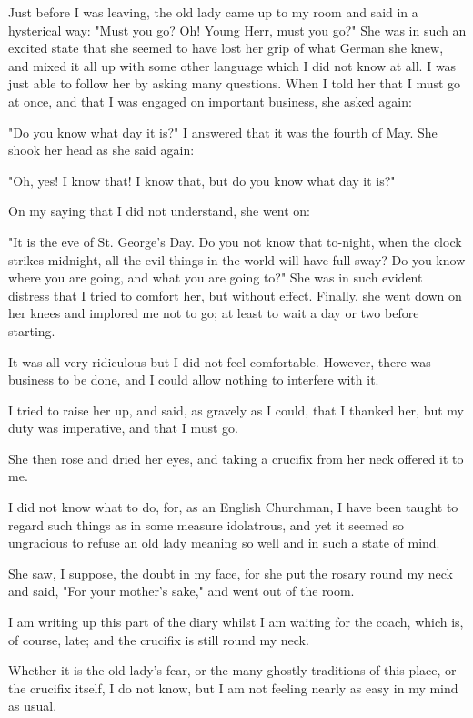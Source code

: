 Just before I was leaving, the old lady came up to my room and said in a hysterical way: "Must you go? Oh! Young Herr, must you go?" She was in such an excited state that she seemed to have lost her grip of what German she knew, and mixed it all up with some other language which I did not know at all. I was just able to follow her by asking many questions. When I told her that I must go at once, and that I was engaged on important business, she asked again: 

"Do you know what day it is?" I answered that it was the fourth of May. She shook her head as she said again: 

"Oh, yes! I know that! I know that, but do you know what day it is?" 

On my saying that I did not understand, she went on: 

"It is the eve of St. George's Day. Do you not know that to-night, when the clock strikes midnight, all the evil things in the world will have full sway? Do you know where you are going, and what you are going to?" She was in such evident distress that I tried to comfort her, but without effect. Finally, she went down on her knees and implored me not to go; at least to wait a day or two before starting. 

It was all very ridiculous but I did not feel comfortable. However, there was business to be done, and I could allow nothing to interfere with it. 

I tried to raise her up, and said, as gravely as I could, that I thanked her, but my duty was imperative, and that I must go. 

She then rose and dried her eyes, and taking a crucifix from her neck offered it to me. 

I did not know what to do, for, as an English Churchman, I have been taught to regard such things as in some measure idolatrous, and yet it seemed so ungracious to refuse an old lady meaning so well and in such a state of mind. 

She saw, I suppose, the doubt in my face, for she put the rosary round my neck and said, "For your mother's sake," and went out of the room. 

I am writing up this part of the diary whilst I am waiting for the coach, which is, of course, late; and the crucifix is still round my neck. 

Whether it is the old lady's fear, or the many ghostly traditions of this place, or the crucifix itself, I do not know, but I am not feeling nearly as easy in my mind as usual. 

